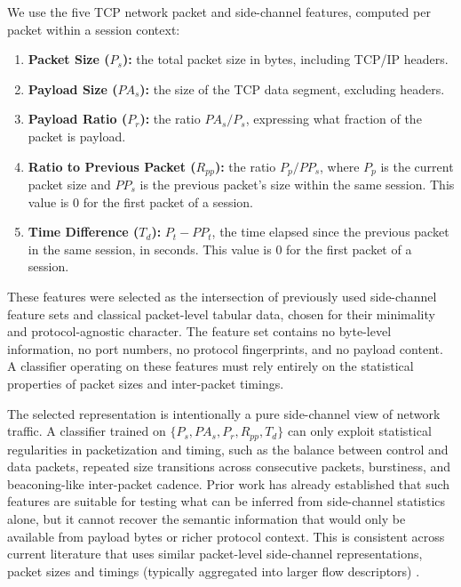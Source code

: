 \documentclass[conference]{IEEEtran}
\begin{document}
We use the five TCP network packet and side-channel features, computed per packet within a session context:

\begin{enumerate}
\item \textbf{Packet Size ($P_s$):} the total packet size in bytes, including TCP/IP headers.
\item \textbf{Payload Size ($PA_s$):} the size of the TCP data segment, excluding headers.
\item \textbf{Payload Ratio ($P_r$):} the ratio $PA_s / P_s$, expressing what fraction of the packet is payload.
\item \textbf{Ratio to Previous Packet ($R_{pp}$):} the ratio $P_p / PP_s$, where $P_p$ is the current packet size and $PP_s$ is the previous packet's size within the same session. This value is $0$ for the first packet of a session.
\item \textbf{Time Difference ($T_d$):} $P_t - PP_t$, the time elapsed since the previous packet in the same session, in seconds. This value is $0$ for the first packet of a session.
\end{enumerate}

These features were selected as the intersection of previously used side-channel feature sets and classical packet-level tabular data, chosen for their minimality and protocol-agnostic character. The feature set contains no byte-level information, no port numbers, no protocol fingerprints, and no payload content. A classifier operating on these features must rely entirely on the statistical properties of packet sizes and inter-packet timings.

The selected representation is intentionally a pure side-channel view of network traffic. A classifier trained on $\{P_s, PA_s, P_r, R_{pp}, T_d\}$ can only exploit statistical regularities in packetization and timing, such as the balance between control and data packets, repeated size transitions across consecutive packets, burstiness, and beaconing-like inter-packet cadence. Prior work has already established that such features are suitable for testing what can be inferred from side-channel statistics alone, but it cannot recover the semantic information that would only be available from payload bytes or richer protocol context. This is consistent across current literature that uses similar packet-level side-channel representations, packet sizes and timings (typically aggregated into larger flow descriptors) \cite{stergiopoulos2018side,chen2010sidechannel,chen2019robust,sharafaldin2018toward,sommer2010outside}. 
\end{document}
